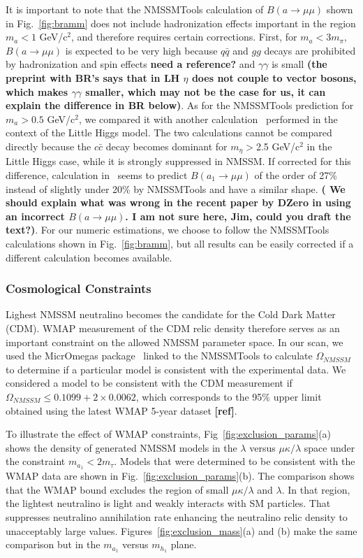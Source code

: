 \documentclass[aps,prl,nofootinbib,superscriptaddress]{revtex4}
\begin{document}
It is important to note that the NMSSMTools calculation of $B(a\to \mu \mu)$ shown in Fig.~\ref{fig:bramm} 
does not include hadronization effects important in the region $m_a<1$ GeV/c$^2$, 
and therefore requires certain corrections. First, for $m_a<3m_\pi$, $B(a \to \mu\mu)$ is 
expected to be very high because $q\bar{q}$ and $gg$ decays are prohibited by hadronization and 
spin effects {\bf need a reference?} and $\gamma \gamma$ is small {\bf (the preprint with BR's 
says that in LH $\eta$ does not couple to vector bosons, which makes $\gamma \gamma$ smaller, 
which may not be the case for us, it can explain the difference in BR below)}. As for the 
NMSSMTools prediction for $m_a>0.5$ GeV/c$^2$, we compared it with another 
calculation~\cite{LHiggsADecays} performed in the context of the Little Higgs model. 
The two calculations cannot be compared directly because the $c \bar{c}$ decay becomes 
dominant for $m_\eta>$2.5 GeV/c$^2$ in the Little Higgs case, while it is strongly suppressed 
in NMSSM. If corrected for this difference, calculation in~\cite{LHiggsADecays} seems to
predict $B(a_1 \to \mu \mu)$ of the order of 27\% instead of slightly under 20\% by NMSSMTools
and have a similar shape. {\bf( We should explain what was wrong in the recent paper by DZero
in using an incorrect $B(a \to \mu \mu)$. I am not sure here, Jim, could you draft the text?)}. 
For our numeric estimations, we choose to follow the NMSSMTools calculations shown in 
Fig.~\ref{fig:bramm}, but all results can be easily corrected if a different calculation
becomes available.

\subsubsection{Cosmological Constraints}

Lighest NMSSM neutralino becomes the candidate for the Cold Dark Matter (CDM). WMAP measurement of the CDM relic density 
therefore serves as an important constraint on the allowed NMSSM parameter space. 
In our scan, we used the MicrOmegas package~\cite{micrOmegas} linked to the NMSSMTools to calculate $\Omega_{NMSSM}$ 
to determine if a particular model is consistent with the experimental data. We considered a model to be consistent 
with the CDM measurement if $\Omega_{NMSSM} \le 0.1099 + 2\times0.0062$, which corresponds to the 95\% upper limit 
obtained using the latest WMAP 5-year dataset {\bf [ref]}. 

To illustrate the effect of WMAP constraints, Fig~\ref{fig:exclusion_params}(a) shows the density of generated
NMSSM models in the $\lambda$ versus $\mu\kappa/\lambda$ space under the constraint $m_{a_1}<2m_\tau$. Models 
that were determined to be consistent with the WMAP data are shown in Fig.~\ref{fig:exclusion_params}(b). The 
comparison shows that the WMAP bound excludes the region of small $\mu\kappa/\lambda$ and $\lambda$. In that region, 
the lightest neutralino is light and weakly interacts with SM particles. That suppresses neutralino annihilation 
rate enhancing the neutralino relic density to unacceptably large values. Figures~\ref{fig:exclusion_mass}(a) and (b)
make the same comparison but in the $m_{a_1}$ versus $m_{h_1}$ plane.
\end{document}
